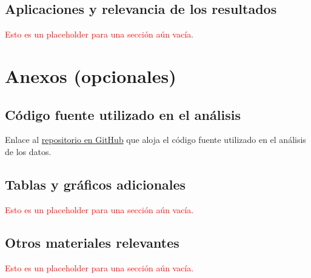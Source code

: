 \documentclass[a4paper]{report}
\begin{document}
\section{Aplicaciones y relevancia de los resultados}
\textcolor{red}{Esto es un placeholder para una sección aún vacía.}




\printbibliography[heading=bibintoc] %



\chapter*{Anexos (opcionales)}


\section{Código fuente utilizado en el análisis}
Enlace al \href{https://github.com/bettachini/tallerTesis/tree/main/sismosURL}{repositorio en GitHub} que aloja el código fuente utilizado en el análisis de los datos.



\section{Tablas y gráficos adicionales}
\textcolor{red}{Esto es un placeholder para una sección aún vacía.}


\section{Otros materiales relevantes}
\textcolor{red}{Esto es un placeholder para una sección aún vacía.}
\end{document}
